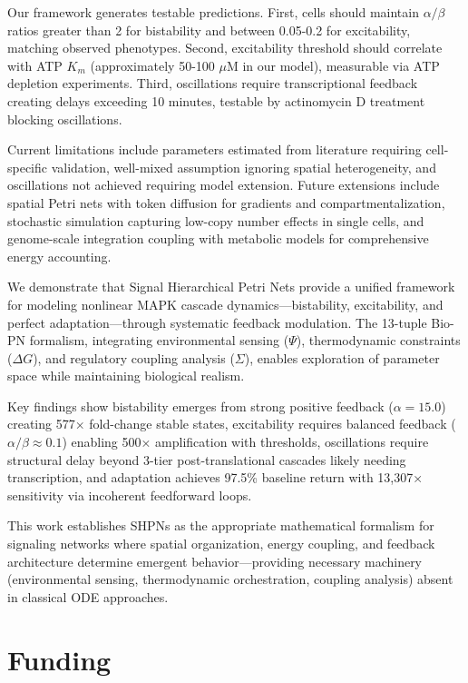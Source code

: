 \documentclass[twocolumn,11pt]{article}
\begin{document}
Our framework generates testable predictions. First, cells should maintain $\alpha/\beta$ ratios greater than 2 for bistability and between 0.05-0.2 for excitability, matching observed phenotypes. Second, excitability threshold should correlate with ATP $K_m$ (approximately 50-100 $\mu$M in our model), measurable via ATP depletion experiments. Third, oscillations require transcriptional feedback creating delays exceeding 10 minutes, testable by actinomycin D treatment blocking oscillations.

Current limitations include parameters estimated from literature requiring cell-specific validation, well-mixed assumption ignoring spatial heterogeneity, and oscillations not achieved requiring model extension. Future extensions include spatial Petri nets with token diffusion for gradients and compartmentalization, stochastic simulation capturing low-copy number effects in single cells, and genome-scale integration coupling with metabolic models for comprehensive energy accounting.

We demonstrate that Signal Hierarchical Petri Nets provide a unified framework for modeling nonlinear MAPK cascade dynamics—bistability, excitability, and perfect adaptation—through systematic feedback modulation. The 13-tuple Bio-PN formalism, integrating environmental sensing ($\Psi$), thermodynamic constraints ($\Delta G$), and regulatory coupling analysis ($\Sigma$), enables exploration of parameter space while maintaining biological realism.

Key findings show bistability emerges from strong positive feedback ($\alpha = 15.0$) creating 577× fold-change stable states, excitability requires balanced feedback ($\alpha/\beta \approx 0.1$) enabling 500× amplification with thresholds, oscillations require structural delay beyond 3-tier post-translational cascades likely needing transcription, and adaptation achieves 97.5\% baseline return with 13,307× sensitivity via incoherent feedforward loops.


This work establishes SHPNs as the appropriate mathematical formalism for signaling networks where spatial organization, energy coupling, and feedback architecture determine emergent behavior—providing necessary machinery (environmental sensing, thermodynamic orchestration, coupling analysis) absent in classical ODE approaches.

\section*{Funding}
\end{document}
